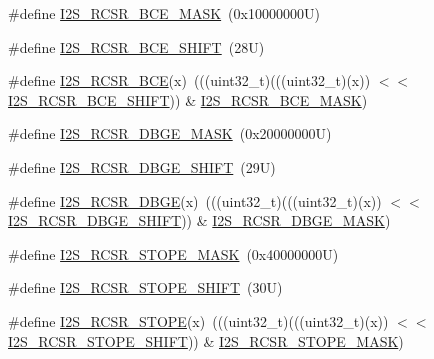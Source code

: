 \begin{DoxyCompactItemize}
\item 
\#define \mbox{\hyperlink{group___i2_s___register___masks_ga54ae667249649209bb97b5bbbc5fd782}{I2\+S\+\_\+\+R\+C\+S\+R\+\_\+\+B\+C\+E\+\_\+\+M\+A\+SK}}~(0x10000000\+U)
\item 
\#define \mbox{\hyperlink{group___i2_s___register___masks_ga6db23fcadacc96fdf65ce93ff944c40d}{I2\+S\+\_\+\+R\+C\+S\+R\+\_\+\+B\+C\+E\+\_\+\+S\+H\+I\+FT}}~(28\+U)
\item 
\#define \mbox{\hyperlink{group___i2_s___register___masks_ga0d75fbadb9cf213a640ef75cb23c2278}{I2\+S\+\_\+\+R\+C\+S\+R\+\_\+\+B\+CE}}(x)~(((uint32\+\_\+t)(((uint32\+\_\+t)(x)) $<$$<$ \mbox{\hyperlink{group___i2_s___register___masks_ga6db23fcadacc96fdf65ce93ff944c40d}{I2\+S\+\_\+\+R\+C\+S\+R\+\_\+\+B\+C\+E\+\_\+\+S\+H\+I\+FT}})) \& \mbox{\hyperlink{group___i2_s___register___masks_ga54ae667249649209bb97b5bbbc5fd782}{I2\+S\+\_\+\+R\+C\+S\+R\+\_\+\+B\+C\+E\+\_\+\+M\+A\+SK}})
\item 
\#define \mbox{\hyperlink{group___i2_s___register___masks_ga3b612d1b86edf89a8e6c3bfb5a8bce4e}{I2\+S\+\_\+\+R\+C\+S\+R\+\_\+\+D\+B\+G\+E\+\_\+\+M\+A\+SK}}~(0x20000000\+U)
\item 
\#define \mbox{\hyperlink{group___i2_s___register___masks_ga631cd411a0272dfbd2cf89390a60ae98}{I2\+S\+\_\+\+R\+C\+S\+R\+\_\+\+D\+B\+G\+E\+\_\+\+S\+H\+I\+FT}}~(29\+U)
\item 
\#define \mbox{\hyperlink{group___i2_s___register___masks_ga0ec93fc9c79aced80bdae5febc174538}{I2\+S\+\_\+\+R\+C\+S\+R\+\_\+\+D\+B\+GE}}(x)~(((uint32\+\_\+t)(((uint32\+\_\+t)(x)) $<$$<$ \mbox{\hyperlink{group___i2_s___register___masks_ga631cd411a0272dfbd2cf89390a60ae98}{I2\+S\+\_\+\+R\+C\+S\+R\+\_\+\+D\+B\+G\+E\+\_\+\+S\+H\+I\+FT}})) \& \mbox{\hyperlink{group___i2_s___register___masks_ga3b612d1b86edf89a8e6c3bfb5a8bce4e}{I2\+S\+\_\+\+R\+C\+S\+R\+\_\+\+D\+B\+G\+E\+\_\+\+M\+A\+SK}})
\item 
\#define \mbox{\hyperlink{group___i2_s___register___masks_ga44e7cececc92de704481e691cf2d07da}{I2\+S\+\_\+\+R\+C\+S\+R\+\_\+\+S\+T\+O\+P\+E\+\_\+\+M\+A\+SK}}~(0x40000000\+U)
\item 
\#define \mbox{\hyperlink{group___i2_s___register___masks_ga6bb5b025ffa2d2916eec0a3fc9a973aa}{I2\+S\+\_\+\+R\+C\+S\+R\+\_\+\+S\+T\+O\+P\+E\+\_\+\+S\+H\+I\+FT}}~(30\+U)
\item 
\#define \mbox{\hyperlink{group___i2_s___register___masks_ga48c5064c5d823baad8b7cfe544b21038}{I2\+S\+\_\+\+R\+C\+S\+R\+\_\+\+S\+T\+O\+PE}}(x)~(((uint32\+\_\+t)(((uint32\+\_\+t)(x)) $<$$<$ \mbox{\hyperlink{group___i2_s___register___masks_ga6bb5b025ffa2d2916eec0a3fc9a973aa}{I2\+S\+\_\+\+R\+C\+S\+R\+\_\+\+S\+T\+O\+P\+E\+\_\+\+S\+H\+I\+FT}})) \& \mbox{\hyperlink{group___i2_s___register___masks_ga44e7cececc92de704481e691cf2d07da}{I2\+S\+\_\+\+R\+C\+S\+R\+\_\+\+S\+T\+O\+P\+E\+\_\+\+M\+A\+SK}})
$$
\end{DoxyCompactItemize}
